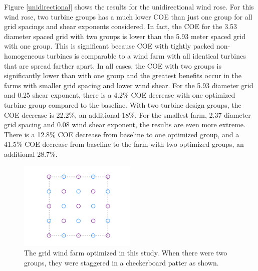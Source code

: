 \documentclass[conf]{new-aiaa}
\begin{document}
Figure \ref{unidirectional} shows the results for the unidirectional wind rose.
For this wind rose, two turbine groups has a much lower COE than just one group for all grid spacings and shear exponents considered.
In fact, the COE for the 3.53 diameter spaced grid with two groups is lower than the 5.93 meter spaced grid with one group. This is significant because COE with tightly packed non-homogeneous turbines is comparable to a wind farm with all identical turbines that are spread farther apart. In all cases, the COE with two groups is significantly lower than with one group and the greatest benefits occur in the farms with smaller grid spacing and lower wind shear. 
For the 5.93 diameter grid and 0.25 shear exponent, there is a 4.2\% COE decrease with one optimized turbine group compared to the baseline. With two turbine design groups, the COE decrease is 22.2\%, an additional 18\%. For the smallest farm, 2.37 diameter grid spacing and 0.08 wind shear exponent, the results are even more extreme. There is a 12.8\% COE decrease from baseline to one optimized group, and a 41.5\% COE decrease from baseline to the farm with two optimized groups, an additional 28.7\%.


\begin{figure}[htbp]
\begin{centering}
	\includegraphics[width=0.5\textwidth]{layout.pdf}
    \caption{The grid wind farm optimized in this study. When there were two groups, they were staggered in a checkerboard patter as shown.}
  \label{layout}
  \end{centering}
\end{figure}
\end{document}
